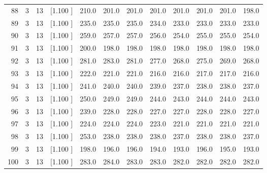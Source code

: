 \documentclass[12pt,a4paper]{article}
\begin{document}
\begin{center}
{\begin{tabular}{r r r r r r r r r r r r}
  88&  3& 13&[1.100     ]&   210.0&   201.0&   201.0&   201.0&   201.0&   201.0&   201.0&   198.0\\[-0.02in]
  89&  3& 13&[1.100     ]&   235.0&   235.0&   235.0&   234.0&   233.0&   233.0&   233.0&   233.0\\[-0.02in]
  90&  3& 13&[1.100     ]&   259.0&   257.0&   257.0&   256.0&   254.0&   255.0&   255.0&   254.0\\[-0.02in]
  91&  3& 13&[1.100     ]&   200.0&   198.0&   198.0&   198.0&   198.0&   198.0&   198.0&   198.0\\[-0.02in]
  92&  3& 13&[1.100     ]&   281.0&   283.0&   281.0&   277.0&   268.0&   275.0&   269.0&   268.0\\[-0.02in]
  93&  3& 13&[1.100     ]&   222.0&   221.0&   221.0&   216.0&   216.0&   217.0&   217.0&   216.0\\[-0.02in]
  94&  3& 13&[1.100     ]&   241.0&   240.0&   240.0&   239.0&   237.0&   238.0&   238.0&   237.0\\[-0.02in]
  95&  3& 13&[1.100     ]&   250.0&   249.0&   249.0&   244.0&   243.0&   244.0&   244.0&   243.0\\[-0.02in]
  96&  3& 13&[1.100     ]&   239.0&   228.0&   228.0&   227.0&   227.0&   228.0&   228.0&   227.0\\[-0.02in]
  97&  3& 13&[1.100     ]&   224.0&   224.0&   224.0&   223.0&   221.0&   221.0&   221.0&   221.0\\[-0.02in]
  98&  3& 13&[1.100     ]&   253.0&   238.0&   238.0&   238.0&   237.0&   238.0&   238.0&   237.0\\[-0.02in]
  99&  3& 13&[1.100     ]&   198.0&   196.0&   196.0&   194.0&   193.0&   196.0&   195.0&   193.0\\[-0.02in]
 100&  3& 13&[1.100     ]&   283.0&   284.0&   283.0&   283.0&   282.0&   282.0&   282.0&   282.0\\[-0.02in]

\hline
\end{tabular}}
\end{center}
\end{document}
